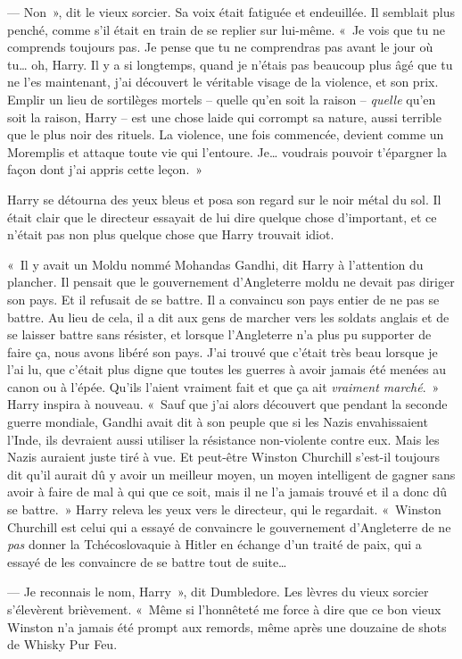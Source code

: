 --- Non~», dit le vieux sorcier.
Sa voix était fatiguée et endeuillée.
Il semblait plus penché, comme s'il était en train de se replier sur lui-même.
«~Je vois que tu ne comprends toujours pas.
Je pense que tu ne comprendras pas avant le jour où tu… oh, Harry.
Il y a si longtemps, quand je n'étais pas beaucoup plus âgé que tu ne l'es maintenant, j'ai découvert le véritable visage de la violence, et son prix.
Emplir un lieu de sortilèges mortels -- quelle qu'en soit la raison -- \emph{quelle} qu'en soit la raison, Harry -- est une chose laide qui corrompt sa nature, aussi terrible que le plus noir des rituels.
La violence, une fois commencée, devient comme un Moremplis et attaque toute vie qui l'entoure.
Je… voudrais pouvoir t'épargner la façon dont j'ai appris cette leçon.~»

Harry se détourna des yeux bleus et posa son regard sur le noir métal du sol.
Il était clair que le directeur essayait de lui dire quelque chose d'important, et ce n'était pas non plus quelque chose que Harry trouvait idiot.

«~Il y avait un Moldu nommé Mohandas Gandhi, dit Harry à l'attention du plancher.
Il pensait que le gouvernement d'Angleterre moldu ne devait pas diriger son pays.
Et il refusait de se battre.
Il a convaincu son pays entier de ne pas se battre.
Au lieu de cela, il a dit aux gens de marcher vers les soldats anglais et de se laisser battre sans résister, et lorsque l'Angleterre n'a plus pu supporter de faire ça, nous avons libéré son pays.
J'ai trouvé que c'était très beau lorsque je l'ai lu, que c'était plus digne que toutes les guerres à avoir jamais été menées au canon ou à l'épée.
Qu'ils l'aient vraiment fait et que ça ait \emph{vraiment marché}.~»
Harry inspira à nouveau.
«~Sauf que j'ai alors découvert que pendant la seconde guerre mondiale, Gandhi avait dit à son peuple que si les Nazis envahissaient l'Inde, ils devraient aussi utiliser la résistance non-violente contre eux.
Mais les Nazis auraient juste tiré à vue.
Et peut-être Winston Churchill s'est-il toujours dit qu'il aurait dû y avoir un meilleur moyen, un moyen intelligent de gagner sans avoir à faire de mal à qui que ce soit, mais il ne l'a jamais trouvé et il a donc dû se battre.~»
Harry releva les yeux vers le directeur, qui le regardait.
«~Winston Churchill est celui qui a essayé de convaincre le gouvernement d'Angleterre de ne \emph{pas} donner la Tchécoslovaquie à Hitler en échange d'un traité de paix, qui a essayé de les convaincre de se battre tout de suite…

--- Je reconnais le nom, Harry~», dit Dumbledore.
Les lèvres du vieux sorcier s'élevèrent brièvement.
«~Même si l'honnêteté me force à dire que ce bon vieux Winston n'a jamais été prompt aux remords, même après une douzaine de shots de Whisky Pur Feu.

